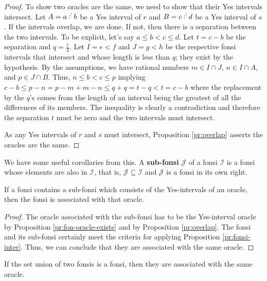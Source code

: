 \documentclass[12pt]{article}
\begin{document}
\begin{proof}
To show two oracles are the same, we need to show that their Yes intervals intersect. Let $A=a\lte b$ be a Yes interval of $r$ and $B=c \lte d$ be a Yes interval of $s$. If the intervals overlap, we are done. If not, then there is a separation between the two intervals. To be explicit, let's say $a \leq b < c \leq d$. Let $t = c-b$ be the separation and $q = \frac{t}{3}$. Let $I= e\lt f$ and $J= g \lt h$ be the respective fonsi intervals that intersect and whose length is less than $q$;  they exist by the hypothesis. By the assumptions, we have rational numbers $m \in I \cap J$, $n \in I \cap A$, and $p \in J \cap B$. Thus,  $n \leq b < c \leq p$ implying $c-b \leq p - n  = p-m + m-n \leq q + q = t - q < t = c-b$ where the replacement by the $q$'s comes from the length of an interval being the greatest of all the differences of its members. The inequality is clearly a contradiction and therefore the separation $t$ must be zero and the two intervals must intersect. 
 
As any Yes intervals of $r$ and $s$ must intersect, Proposition \ref{pr:overlap} asserts the oracles are the same.  
\end{proof}

We have some useful corollaries from this. A \textbf{sub-fonsi} $\mathcal{J}$ of a fonsi $\mathcal{I}$ is a fonsi whose elements are also in $\mathcal{I}$, that is, $\mathcal{J} \subseteq \mathcal{I}$ and $\mathcal{J}$ is a fonsi in its own right.  

\begin{corollary}\label{cor:sub-fonsi}
    If a fonsi contains a sub-fonsi which consists of the Yes-intervals of an oracle, then the fonsi is associated with that oracle. 
\end{corollary}

\begin{proof}
    The oracle associated with the sub-fonsi has to be the Yes-interval oracle by Proposition \ref{pr:fon-oracle-exists} and by Proposition \ref{pr:overlap}. The fonsi and its sub-fonsi certainly meet the criteria for applying Proposition \ref{pr:fonsi-inter}. Thus, we can conclude that they are associated with the same oracle. 
\end{proof}

\begin{corollary}
    If the set union of two fonsis is a fonsi, then they are associated with the same oracle.
\end{corollary}
\end{document}
